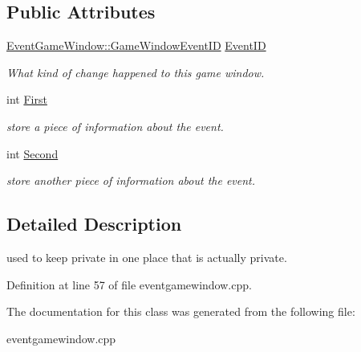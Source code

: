 \subsection*{Public Attributes}
\begin{DoxyCompactItemize}
\item 
\hypertarget{classphys_1_1EventGameWindowData_aee5633e59e1f147d001d04e98a4f53a0}{
\hyperlink{classphys_1_1EventGameWindow_a45225255070513d3cff88cdfea25cc09}{EventGameWindow::GameWindowEventID} \hyperlink{classphys_1_1EventGameWindowData_aee5633e59e1f147d001d04e98a4f53a0}{EventID}}
\label{d1/d45/classphys_1_1EventGameWindowData_aee5633e59e1f147d001d04e98a4f53a0}

\begin{DoxyCompactList}\small\item\em What kind of change happened to this game window. \item\end{DoxyCompactList}\item 
\hypertarget{classphys_1_1EventGameWindowData_ac21fb863e39f60821ea8017025884078}{
int \hyperlink{classphys_1_1EventGameWindowData_ac21fb863e39f60821ea8017025884078}{First}}
\label{d1/d45/classphys_1_1EventGameWindowData_ac21fb863e39f60821ea8017025884078}

\begin{DoxyCompactList}\small\item\em store a piece of information about the event. \item\end{DoxyCompactList}\item 
\hypertarget{classphys_1_1EventGameWindowData_ae4d7e70e2539f90dc18272bc092b711e}{
int \hyperlink{classphys_1_1EventGameWindowData_ae4d7e70e2539f90dc18272bc092b711e}{Second}}
\label{d1/d45/classphys_1_1EventGameWindowData_ae4d7e70e2539f90dc18272bc092b711e}

\begin{DoxyCompactList}\small\item\em store another piece of information about the event. \item\end{DoxyCompactList}\end{DoxyCompactItemize}


\subsection{Detailed Description}
used to keep private in one place that is actually private. 

Definition at line 57 of file eventgamewindow.cpp.



The documentation for this class was generated from the following file:\begin{DoxyCompactItemize}
\item 
eventgamewindow.cpp\end{DoxyCompactItemize}
